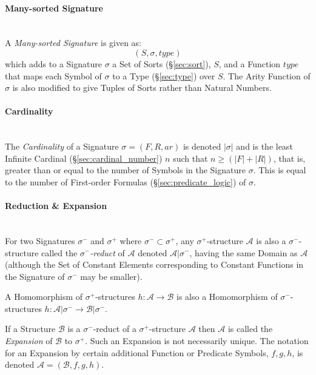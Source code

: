 \paragraph{Many-sorted Signature}\label{sec:manysorted_signature}
\hfill \\

A \emph{Many-sorted Signature} is given as:
\[
  (S, \sigma, type)
\]
which adds to a Signature $\sigma$ a Set of Sorts (\S\ref{sec:sort}),
$S$, and a Function $type$ that maps each Symbol of $\sigma$ to a Type
(\S\ref{sec:type}) over $S$. The Arity Function of $\sigma$ is also
modified to give Tuples of Sorts rather than Natural Numbers.



\paragraph{Cardinality}\label{sec:signature_cardinality}\hfill \\

The \emph{Cardinality} of a Signature $\sigma = (F,R,ar)$ is denoted
$|\sigma|$ and is the least Infinite Cardinal
(\S\ref{sec:cardinal_number}) $n$ such that $n \geq (|F| + |R|)$, that
is, greater than or equal to the number of Symbols in the Signature
$\sigma$. This is equal to the number of First-order Formulas
(\S\ref{sec:predicate_logic}) of $\sigma$.



\paragraph{Reduction \& Expansion}\label{sec:reduct_expansion}
\hfill \\

For two Signatures $\sigma^-$ and $\sigma^+$ where $\sigma^- \subset
\sigma^+$, any $\sigma^+$-structure $\mathcal{A}$ is also a
$\sigma^-$-structure called the \emph{$\sigma^-$-reduct} of
$\mathcal{A}$ denoted $\mathcal{A}|\sigma^-$, having the same Domain
as $\mathcal{A}$ (although the Set of Constant Elements corresponding
to Constant Functions in the Signature of $\sigma^-$ may be smaller).

A Homomorphism of $\sigma^+$-structures $h : \mathcal{A} \rightarrow
\mathcal{B}$ is also a Homomorphism of $\sigma^-$-structures $h :
\mathcal{A} | \sigma^- \rightarrow \mathcal{B} | \sigma^-$.

If a Structure $\mathcal{B}$ is a $\sigma^-$-reduct of a
$\sigma^+$-structure $\mathcal{A}$ then $\mathcal{A}$ is called the
\emph{Expansion} of $\mathcal{B}$ to $\sigma^+$. Such an Expansion is
not necessarily unique. The notation for an Expansion by certain
additional Function or Predicate Symbols, $f, g, h$, is denoted
$\mathcal{A} = (\mathcal{B}, f, g, h)$.



